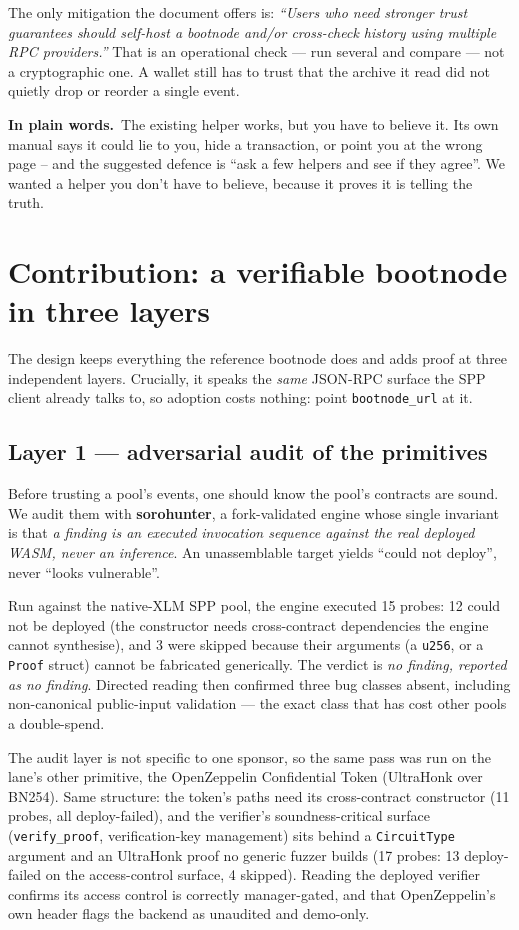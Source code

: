 \documentclass[11pt]{article}
\newcommand{\intuition}[1]{%
  \par\vspace{0.5em}%
  \noindent\colorbox{soft}{\parbox{\dimexpr\linewidth-2\fboxsep}{%
  \small\textbf{\color{klein}In plain words.}\ #1}}%
  \par\vspace{0.5em}%
}
\newcommand{\code}[1]{\texttt{\small #1}}
\begin{document}
The only mitigation the document offers is: \emph{``Users who need stronger trust
guarantees should self-host a bootnode and/or cross-check history using multiple
RPC providers.''} That is an operational check --- run several and compare --- not
a cryptographic one. A wallet still has to trust that the archive it read did not
quietly drop or reorder a single event.

\intuition{The existing helper works, but you have to believe it. Its own manual
says it could lie to you, hide a transaction, or point you at the wrong page --
and the suggested defence is ``ask a few helpers and see if they agree''. We
wanted a helper you don't have to believe, because it proves it is telling the
truth.}

\section{Contribution: a verifiable bootnode in three layers}

The design keeps everything the reference bootnode does and adds proof at three
independent layers. Crucially, it speaks the \emph{same} JSON-RPC surface the SPP
client already talks to, so adoption costs nothing: point \code{bootnode\_url} at
it.

\subsection{Layer 1 --- adversarial audit of the primitives}

Before trusting a pool's events, one should know the pool's contracts are sound.
We audit them with \textbf{sorohunter}, a fork-validated engine whose single
invariant is that \emph{a finding is an executed invocation sequence against the
real deployed WASM, never an inference}. An unassemblable target yields ``could
not deploy'', never ``looks vulnerable''.

Run against the native-XLM SPP pool, the engine executed 15 probes: 12 could not
be deployed (the constructor needs cross-contract dependencies the engine cannot
synthesise), and 3 were skipped because their arguments (a \code{u256}, or a
\code{Proof} struct) cannot be fabricated generically. The verdict is
\emph{no finding, reported as no finding}. Directed reading then confirmed three
bug classes absent, including non-canonical public-input validation --- the exact
class that has cost other pools a double-spend.

The audit layer is not specific to one sponsor, so the same pass was run on the
lane's other primitive, the OpenZeppelin Confidential Token (UltraHonk over
BN254). Same structure: the token's paths need its cross-contract constructor
(11 probes, all deploy-failed), and the verifier's soundness-critical surface
(\code{verify\_proof}, verification-key management) sits behind a
\code{CircuitType} argument and an UltraHonk proof no generic fuzzer builds
(17 probes: 13 deploy-failed on the access-control surface, 4 skipped). Reading
the deployed verifier confirms its access control is correctly manager-gated, and
that OpenZeppelin's own header flags the backend as unaudited and demo-only.
\end{document}
